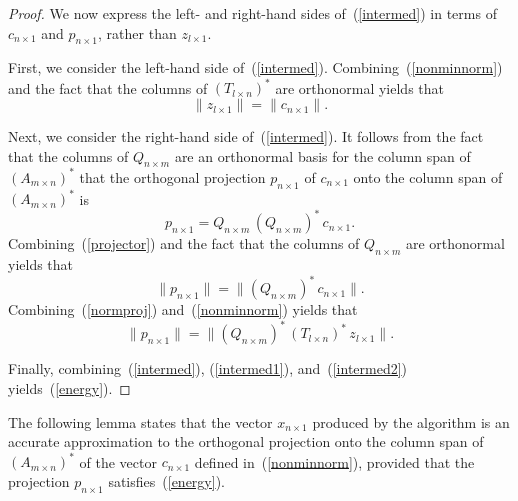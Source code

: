 \documentclass[letterpaper,12pt]{article}
\begin{document}
\begin{proof}
We now express the left- and right-hand sides of~(\ref{intermed})
in terms of $c_{n \times 1}$ and $p_{n \times 1}$,
rather than $z_{l \times 1}$.

First, we consider the left-hand side of~(\ref{intermed}).
Combining~(\ref{nonminnorm}) and the fact that the columns
of $(T_{l \times n})^*$ are orthonormal yields that
\begin{equation}
\label{intermed1}
\| z_{l \times 1} \| = \| c_{n \times 1} \|.
\end{equation}

Next, we consider the right-hand side of~(\ref{intermed}).
It follows from the fact that the columns of $Q_{n \times m}$
are an orthonormal basis for the column span of $(A_{m \times n})^*$
that the orthogonal projection $p_{n \times 1}$
of $c_{n \times 1}$ onto the column span of $(A_{m \times n})^*$ is
\begin{equation}
\label{projector}
p_{n \times 1} = Q_{n \times m} \, (Q_{n \times m})^* \, c_{n \times 1}.
\end{equation}
Combining~(\ref{projector}) and the fact that the columns
of $Q_{n \times m}$ are orthonormal yields that
\begin{equation}
\label{normproj}
\| p_{n \times 1} \| = \| (Q_{n \times m})^* \, c_{n \times 1} \|.
\end{equation}
Combining~(\ref{normproj}) and~(\ref{nonminnorm}) yields that
\begin{equation}
\label{intermed2}
\| p_{n \times 1} \|
= \| (Q_{n \times m})^* \, (T_{l \times n})^* \, z_{l \times 1}\|.
\end{equation}

Finally, combining~(\ref{intermed}), (\ref{intermed1}), and~(\ref{intermed2})
yields~(\ref{energy}).
\end{proof}


The following lemma states that the vector $x_{n \times 1}$
produced by the algorithm is an accurate approximation
to the orthogonal projection onto the column span of $(A_{m \times n})^*$
of the vector $c_{n \times 1}$ defined in~(\ref{nonminnorm}),
provided that the projection $p_{n \times 1}$ satisfies~(\ref{energy}).
\end{document}
